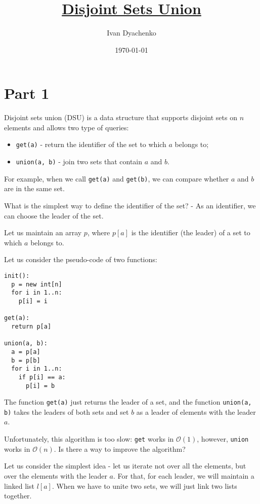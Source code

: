 \documentclass[11pt]{article}
\author{Ivan Dyachenko}
\date{\today}
\title{\href{https://codeforces.com/edu/course/2/lesson/7}{Disjoint Sets Union}}
\begin{document}
\maketitle
\tableofcontents


\section{Part 1}
\label{sec:org79b3ab2}
Disjoint sets union (DSU) is a data structure that supports disjoint sets on \(n\) elements and
allows two type of queries:
\begin{itemize}
\item \texttt{get(a)} - return the identifier of the set to which \(a\) belongs to;
\item \texttt{union(a, b)} - join two sets that contain \(a\) and \(b\).
\end{itemize}

For example, when we call \texttt{get(a)} and \texttt{get(b)}, we can compare whether \(a\) and \(b\) are in the
same set.

What is the simplest way to define the identifier of the set? - As an identifier, we can choose
the leader of the set.

Let us maintain an array \(p\), where \(p[a]\) is the identifier (the leader) of a set to which \(a\)
belongs to.

Let us consider the pseudo-code of two functions:
\begin{verbatim}
init():
  p = new int[n]
  for i in 1..n:
    p[i] = i

get(a):
  return p[a]

union(a, b):
  a = p[a]
  b = p[b]
  for i in 1..n:
    if p[i] == a:
      p[i] = b
\end{verbatim}

The function \texttt{get(a)} just returns the leader of a set, and the function \texttt{union(a, b)} takes the
leaders of both sets and set \(b\) as a leader of elements with the leader \(a\).

Unfortunately, this algorithm is too slow: \texttt{get} works in \(\mathcal{O}(1)\), however, \texttt{union} works
in \(\mathcal{O}(n)\). Is there a way to improve the algorithm?

Let us consider the simplest idea - let us iterate not over all the elements, but over the
elements with the leader \(a\). For that, for each leader, we will maintain a linked list
\(l[a]\). When we have to unite two sets, we will just link two lists together.
\end{document}
